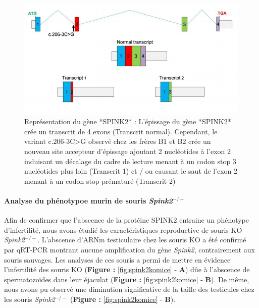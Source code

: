 \documentclass[12pt,twoside]{reedthesis}
\theoremstyle{definition}
\theoremstyle{definition}
\theoremstyle{remark}
\begin{document}
  \begin{figure}
  
  {\centering \includegraphics[scale=0.42]{figure/spink2_transcripts} 
  
  }
  
  \caption[Représentation du gène *SPINK2*]{Représentation du gène *SPINK2* : L'épissage du gène *SPINK2* crée un transcrit de 4 exons (Transcrit normal). Cependant, le variant c.206-3C>G observé chez les frères B1 et B2 crée un nouveau site accepteur d'épissage ajoutant 2 nucléotides à l'exon 2 induisant un décalage du cadre de lecture menant à un codon stop 3 nucléotides plus loin (Transcrit 1) et / ou causant le saut de l'exon 2 menant à un codon stop prématuré (Transcrit 2)}\label{fig:spink2trans}
  \end{figure}
  
  \paragraph{\texorpdfstring{Analyse du phénotypoe murin de souris
  \emph{Spink2}\(^{-/-}\)}{Analyse du phénotypoe murin de souris Spink2\^{}\{-/-\}}}\label{analyse-du-phenotypoe-murin-de-souris-spink2--}
  
  Afin de confirmer que l'abscence de la protéine SPINK2 entraine un
  phénotype d'infertilité, nous avons étudié les caractéristiques
  reproductive de souris KO \emph{Spink2}\(^{-/-}\). L'abscence d'ARNm
  testiculaire chez les souris KO a été confirmé par qRT-PCR montrant
  aucune amplification du gène \emph{Spink2}, contrairement aux souris
  sauvages. Les analyses de ces souris a permi de mettre en évidence
  l'infertilité des souris KO (\textbf{Figure : }\ref{fig:spink2komice} -
  \textbf{A}) dûe à l'abscence de spermatozoïdes dans leur éjaculat
  (\textbf{Figure : }\ref{fig:spink2komice} - \textbf{B}). De même, nous
  avons pu observé une diminution significative de la taille des
  testicules chez les souris \emph{Spink2}\(^{-/-}\) (\textbf{Figure :
  }\ref{fig:spink2komice} - \textbf{B}).
  
\end{document}
